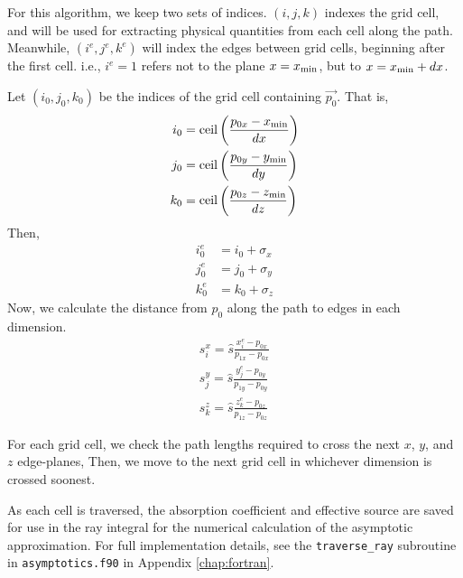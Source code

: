 For this algorithm, we keep two sets of indices. $(i,j,k)$ indexes the grid
cell, and will be used for extracting physical quantities from each cell along
the path.
Meanwhile, $(i^e,j^e,k^e)$ will index the edges between grid cells, beginning
after the first cell. i.e., $i^e=1$ refers not to the plane $x={x_{\min}}$, but to $x={x_{\min}}+dx$.

Let $(i_0, j_0, k_0)$ be the indices of the grid cell containing $\vec{p_0}$.
That is,
\begin{align}
  i_0 &= \mbox{ceil}\left(\frac{p_{0x}-{x_{\min}}}{dx}\right) \\
  j_0 &= \mbox{ceil}\left(\frac{p_{0y}-{y_{\min}}}{dy}\right) \\
  k_0 &= \mbox{ceil}\left(\frac{p_{0z}-{z_{\min}}}{dz}\right)
\end{align}
Then,
\begin{align}
  i_0^e &= i_0 + \sigma_x \\
  j_0^e &= j_0 + \sigma_y \\
  k_0^e &= k_0 + \sigma_z
\end{align}
Now, we calculate the distance from $p_0$ along the path to edges in each dimension.
\begin{align}
  s_i^x = \hat{s}\frac{x_i^e-p_{0x}}{p_{1x}-p_{0x}} \\
  s_j^y = \hat{s}\frac{y_j^e-p_{0y}}{p_{1y}-p_{0y}} \\
  s_k^z = \hat{s}\frac{z_k^e-p_{0z}}{p_{1z}-p_{0z}}
\end{align}

For each grid cell, we check the path lengths
required to cross the next $x$, $y$, and $z$ edge-planes,
Then, we move to the next grid cell in whichever dimension
is crossed soonest.

As each cell is traversed, the absorption coefficient and effective source are saved for use in the ray integral for the numerical calculation of the asymptotic approximation.
For full implementation details, see the \texttt{traverse\_ray} subroutine in \texttt{asymptotics.f90} in Appendix \ref{chap:fortran}.

